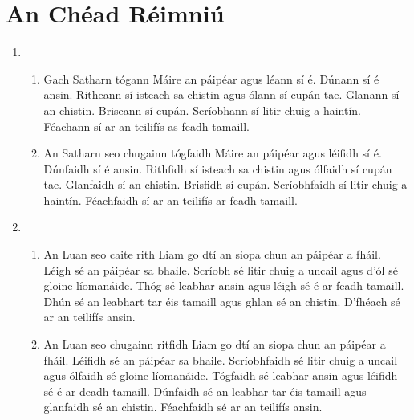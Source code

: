 \documentclass[article,a4paper]{memoir}
\begin{document}
\chapter*{An Ch\'{e}ad R\'{e}imniú}

\begin{enumerate}[{\bfseries 1}]
	\item 	\begin{enumerate}[{\bfseries a)}]
			\item Gach Satharn tógann Máire an páip\'{e}ar agus
				l\'{e}ann sí \'{e}. Dúnann sí \'{e} ansin. 					Ritheann sí
				isteach sa chistin agus ólann sí cupán tae.
				Glanann sí an chistin. Briseann sí cupán.
				Scríobhann sí litir chuig a haintín.
				F\'{e}achann sí ar an teilifís as feadh
				tamaill.
			\item An Satharn seo chugainn tógfaidh Máire an
				páip\'{e}ar agus l\'{e}ifidh sí \'{e}. Dúnfaidh
				sí \'{e} ansin. Rithfidh sí isteach sa chistin 					agus
				ólfaidh sí cupán tae. Glanfaidh sí an chistin.
				Brisfidh sí cupán. Scríobhfaidh sí litir chuig
				a haintín. F\'{e}achfaidh sí ar an teilifís ar
				feadh tamaill.
		\end{enumerate}
	\item   \begin{enumerate}[{\bfseries a)}]
			\item An Luan seo caite rith Liam go dtí an siopa chun
				an páip\'{e}ar a fháil. L\'{e}igh s\'{e} an
			      páip\'{e}ar sa bhaile. Scríobh s\'{e} litir chuig a uncail agus d'ól s\'{e} gloine líomanáide. Thóg s\'{e} leabhar ansin agus l\'{e}igh s\'{e} \'{e} ar feadh tamaill. Dhún s\'{e} an leabhart tar \'{e}is tamaill agus ghlan s\'{e} an chistin. D'fh\'{e}ach s\'{e} ar an teilifís ansin.
			    \item An Luan seo chugainn ritfidh Liam go dtí an siopa chun an páip\'{e}ar a fháil. L\'{e}ifidh s\'{e} an páip\'{e}ar sa bhaile. Scríobhfaidh s\'{e} litir chuig a uncail agus ólfaidh s\'{e} gloine líomanáide. Tógfaidh s\'{e} leabhar ansin agus l\'{e}ifidh s\'{e} \'{e} ar deadh tamaill. Dúnfaidh s\'{e} an leabhar tar \'{e}is tamaill agus glanfaidh s\'{e} an chistin. F\'{e}achfaidh s\'{e} ar an teilifís ansin.
		\end{enumerate}
\end{enumerate}
\end{document}
